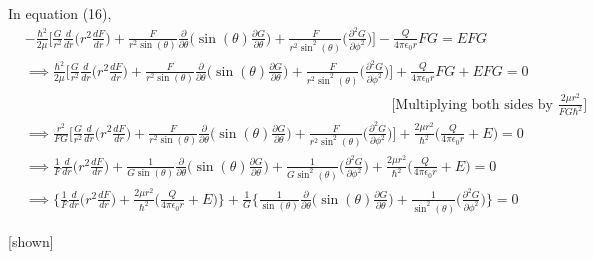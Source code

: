 \documentclass{article}
\begin{document}
\large{
    In equation (16),
\begin{align*}
    &-\frac{\hbar^2}{2\mu}\Big[\frac{G}{r^2}\frac{d}{dr}\Big(r^2\frac{dF}{d r}\Big)+\frac{F}{r^2\sin(\theta)}\frac{\partial}{\partial \theta}\Big(\sin(\theta)\frac{\partial G}{\partial \theta}\Big)+\frac{F}{r^2\sin^2(\theta)}\Big(\frac{\partial^2G}{\partial \phi^2}\Big)\Big]-\frac{Q}{4\pi \epsilon_0r}FG = EFG\\
    &\implies \frac{\hbar^2}{2\mu}\Big[\frac{G}{r^2}\frac{d}{dr}\Big(r^2\frac{dF}{d r}\Big)+\frac{F}{r^2\sin(\theta)}\frac{\partial}{\partial \theta}\Big(\sin(\theta)\frac{\partial G}{\partial \theta}\Big)+\frac{F}{r^2\sin^2(\theta)}\Big(\frac{\partial^2G}{\partial \phi^2}\Big)\Big]+\frac{Q}{4\pi \epsilon_0r}FG + EFG = 0\\
    &\hspace{11cm}\text{[Multiplying both sides by $\frac{2\mu r^2}{FG\hbar^2}$]}\\
    &\implies \frac{r^2}{FG}\Big[\frac{G}{r^2}\frac{d}{dr}\Big(r^2\frac{dF}{dr}\Big)+ \frac{F}{r^2\sin(\theta)}\frac{\partial}{\partial \theta} \Big(\sin(\theta)\frac{\partial G}{\partial \theta}\Big) + \frac{F}{r^2\sin^2(\theta)}\Big(\frac{\partial^2 G}{\partial \phi^2}\Big)\Big] + \frac{2\mu r^2}{\hbar^2}\Big(\frac{Q}{4\pi \epsilon_0r} + E\Big) = 0\\
    &\implies \frac{1}{F} \frac{d}{dr}\Big(r^2\frac{dF}{dr}\Big) + \frac{1}{G\sin(\theta)}\frac{\partial}{\partial \theta}\Big(\sin(\theta)\frac{\partial G}{\partial \theta}\Big) + \frac{1}{G\sin^2(\theta)}\Big(\frac{\partial^2 G}{\partial \phi^2}\Big) + \frac{2\mu r^2}{\hbar^2}\Big(\frac{Q}{4\pi\epsilon_0r} + E\Big) = 0\\
    &\implies \Big\{\frac{1}{F}\frac{d}{dr}\Big(r^2\frac{dF}{dr}\Big) + \frac{2\mu r^2}{\hbar^2}\Big(\frac{Q}{4\pi\epsilon_0r} + E\Big)\Big\} + \frac{1}{G}\Big\{\frac{1}{\sin(\theta)}\frac{\partial}{\partial \theta}\Big(\sin(\theta)\frac{\partial G}{\partial \theta}\Big) + \frac{1}{\sin^2(\theta)}\Big(\frac{\partial ^2 G}{\partial \phi^2}\Big)\Big\} = 0
\end{align*}

\hspace{15cm}[shown]

}
\newpage

\subsection{}%
\end{document}
